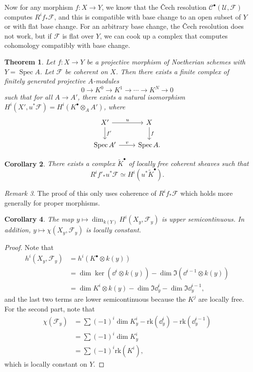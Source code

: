 \documentclass[leqno, openany]{memoir}
\newtheorem{thm}{Theorem}[section]
\newtheorem{cor}[thm]{Corollary}
\theoremstyle{definition}
\theoremstyle{remark}
\newtheorem{rmk}[thm]{Remark}
\theoremstyle{plain}
\theoremstyle{definition}
\theoremstyle{remark}
\newcommand{\mc}[1]{\mathcal{#1}}
\newcommand{\mr}[1]{\mathrm{#1}}
\newcommand{\wt}[1]{\widetilde{#1}}
\DeclareMathOperator{\Spec}{Spec}
\begin{document}
Now for any morphism $f \colon X \to Y$, we know that the \v{C}ech resolution
$\mc{C}^{\bullet}(\mc{U}, \mc{F})$ computes $R^i f_* \mc{F}$, and this is
compatible with base change to an open subset of $Y$ or with flat base change.
For an arbitrary base change, the \v{C}ech resolution does not work, but if
$\mc{F}$ is flat over $Y$, we can cook up a complex that computes cohomology
compatibly with base change.

\begin{thm} Let $f \colon X \to Y$ be a projective morphism of Noetherian
    schemes with $Y = \Spec A$. Let $\mc{F}$ be coherent on $X$. Then there
    exists a finite complex of finitely generated projective $A$-modules \[ 0
    \to K^0 \to K^1 \to \cdots \to K^N \to 0 \] such that for all $A \to A'$,
    there exists a natural isomorphism $H^i(X', u^* \mc{F}) = H^i(K^{\bullet}
    \otimes_A A')$, where \begin{equation*} \begin{tikzcd} X' \ar{r}{u}
        \ar{d}{f'} & X \ar{d}{f} \\ \Spec A' \ar{r}{v} & \Spec A.  \end{tikzcd}
    \end{equation*} \end{thm}

\begin{cor} There exists a complex $\wt{K}^{\bullet}$ of locally free coherent
    sheaves such that \[ R^i f'_* u^* \mc{F} \simeq H^i(u^* \wt{K}^{\bullet}).
    \] \end{cor}

\begin{rmk} The proof of this only uses coherence of $R^i f_* \mc{F}$ which
holds more generally for proper morphisms.  \end{rmk}

\begin{cor} The map $y \mapsto \dim_{k(Y)} H^i(X_y, \mc{F}_y)$ is upper
semicontinuous. In addition, $y \mapsto \chi(X_y, \mc{F}_y)$ is locally
constant.  \end{cor}

\begin{proof} Note that \begin{align*} h^i(X_y, \mc{F}_y) &= h^i(K^{\bullet}
\otimes k(y)) \\ &= \dim \ker (\dd^i \otimes k(y)) - \dim \Im (\dd^{i-1}
\otimes k(y)) \\ &= \dim K^i \otimes k(y) - \dim \Im \dd_y^i - \dim \Im
\dd_y^{i-1}, \end{align*} and the last two terms are lower semicontinuous
    because the $K^j$ are locally free. For the second part, note that
    \begin{align*} \chi(\mc{F}_y) &= \sum {(-1)}^i \dim K_y^i -
        \mr{rk}(\dd_y^i) - \mr{rk}(\dd_y^{i-1}) \\ &= \sum {(-1)}^i \dim K_y^i
                                                \\ &= \sum {(-1)}^i
                                            \mr{rk}(K^i), \end{align*} which is
                                        locally constant on $Y$.  \end{proof}
\end{document}
